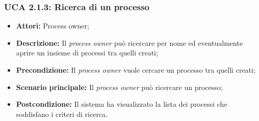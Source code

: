 \hypertarget{A2.1.3}{}
\subsubsection{UCA 2.1.3: Ricerca di un processo}
\begin{itemize}
\item \textbf{Attori:} Process owner;
\item \textbf{Descrizione:} Il \textit{process owner} può ricercare per nome ed eventualmente aprire un insieme di processi tra quelli creati;
\item \textbf{Precondizione:} Il \textit{process owner} vuole cercare un processo tra quelli creati;
\item \textbf{Scenario principale:} Il \textit{process owner} può ricercare un processo;
\item \textbf{Postcondizione:} Il sistema ha visualizzato la lista dei processi che soddisfano i criteri di ricerca.
\end{itemize}

\hypertarget{A2.2}{}
